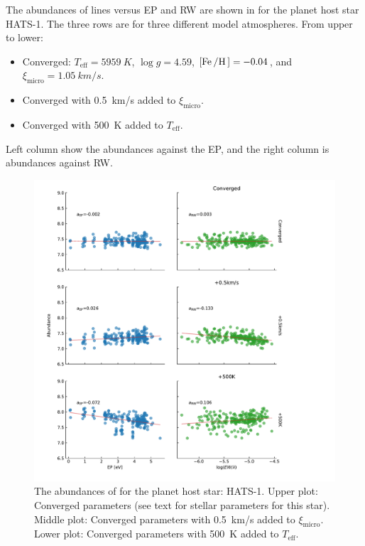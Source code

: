 The abundances of  lines versus EP and RW are shown in
 for the planet host star HATS-1. The three rows are for three
different model atmospheres. From upper to lower:
\begin{itemize}
  \item Converged: $T_\mathrm{eff}=\SI{5959}{K}$,
                   $\log g=4.59$,
                   $[\ion{Fe}/\ion{H}]=-0.04$, and
                   $\xi_\mathrm{micro}=\SI{1.05}{km/s}$.
  \item Converged with \SI{0.5}{km/s} added to $\xi_\mathrm{micro}$.
  \item Converged with \SI{500}{K} added to $T_\mathrm{eff}$.
\end{itemize}
Left column show the abundances against the EP, and the right column is
abundances against RW.

\begin{figure}[htpb!]
    \centering
    \includegraphics[width=0.85\linewidth]{figures/EP_RW_vs_abundance.pdf}
    \caption{The abundances of  for the planet host star: HATS-1.
             Upper plot: Converged parameters (see text for stellar parameters
             for this star).
             Middle plot: Converged parameters with \SI{0.5}{km/s} added to
             $\xi_\mathrm{micro}$.
             Lower plot: Converged parameters with \SI{500}{K} added to
             $T_\mathrm{eff}$.}
    \label{fig:eprw}
\end{figure}

